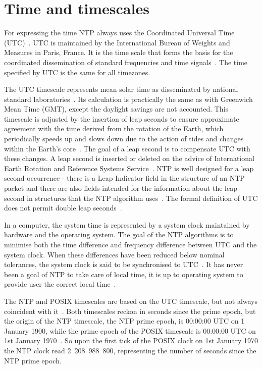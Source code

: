 
\section{Time and timescales}\label{sec:ntp-time}
For expressing the time NTP always uses the Coordinated Universal Time (UTC)~\cite{rfc5905}.
UTC is maintained by the International Bureau of Weights and Measures in Paris, France.
It is the time scale that forms the basis for the coordinated dissemination
of standard frequencies and time signals~\cite{bipm-utc}.
The time specified by UTC is the same for all timezones.

The UTC timescale represents mean solar time as disseminated by national
standard laboratories~\cite{rfc5905}.
Its calculation is practically the same as with Greenwich Mean Time (GMT),
except the daylight savings are not accounted.
This timescale is adjusted by the insertion of leap seconds to ensure approximate
agreement with the time derived from the rotation of the Earth,
which periodically speeds up and slows down due to the action
of tides and changes within the Earth's core~\cite{bipm-utc}.
The goal of a leap second is to compensate UTC with these changes.
A leap second is inserted or deleted on the advice of
International Earth Rotation and Reference Systems Service~\cite{bipm-utc}.
NTP is well designed for a leap second occurrence -
there is a Leap Indicator field
in the structure of an NTP packet and there are also fields intended for
the information about the leap second in structures that the NTP algorithm uses~\cite{rfc5905}.
The formal definition of UTC does not permit double leap seconds~\cite{posix}.

In a computer, the system time is represented by a system clock maintained by
hardware and the operating system.
The goal of the NTP algorithms is to minimise
both the time difference and frequency difference between UTC and the system clock.
When these differences have been reduced below nominal
tolerances, the system clock is said to be synchronised to UTC~\cite{rfc5905}.
It has never been a goal of NTP to take care of local time,
it is up to operating system to provide user the correct local time~\cite{ntp-overview}.

The NTP and POSIX timescales are based on the UTC timescale,
but not always coincident with it~\cite{ntp-leap}.
Both timescales reckon in seconds since the prime epoch,
but the origin of the NTP timescale, the NTP prime epoch, is 00:00:00 UTC on 1 January 1900,
while the prime epoch of the POSIX timescale is 00:00:00 UTC on 1st January 1970~\cite{ntp-leap}.
So upon the first tick of the POSIX clock on 1st January 1970 the NTP clock read 2~208~988~800,
representing the number of seconds since the NTP prime epoch.
